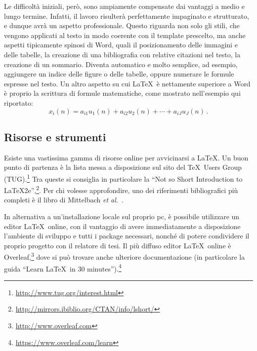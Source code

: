Le difficoltà iniziali, però, sono ampiamente compensate dai vantaggi a medio e lungo termine. Infatti, il lavoro risulterà perfettamente impaginato e strutturato, e dunque avrà un aspetto professionale. Questo riguarda non solo gli stili, che vengono applicati al testo in modo coerente con il template prescelto, ma anche aspetti tipicamente spinosi di Word, quali il posizionamento delle immagini e delle tabelle, la creazione di una bibliografia con relative citazioni nel testo, la creazione di un sommario. Diventa automatico e molto semplice, ad esempio, aggiungere un indice delle figure o delle tabelle, oppure numerare le formule espresse nel testo. Un altro aspetto su cui \LaTeX\ è nettamente superiore a Word è proprio la scrittura di formule matematiche, come mostrato nell'esempio qui riportato:
\begin{equation}
x_i(n) = a_{i1}u_1(n) + a_{i2}u_2(n) + \cdots + a_{iJ}u_J(n) \, .
\label{eq:multimix}
\end{equation}

\subsection{Risorse e strumenti}

Esiste una vastissima gamma di risorse online per avvicinarsi a \LaTeX. Un buon punto di partenza \`e la lista messa a disposizione sul sito del \TeX\ Users Group (TUG).\footnote{\url{http://www.tug.org/interest.html}}
Tra queste si consiglia in particolare la ``Not so Short Introduction to LaTeX2e'',\footnote{\url{http://mirrors.ibiblio.org/CTAN/info/lshort/}}. Per chi volesse approfondire, uno dei riferimenti bibliografici pi\`u completi \`e il libro di Mittelbach {\em et al.}~\cite{mittelbach2004latex}.

In alternativa a un'installazione locale sul proprio pc, \`e possibile utilizzare un editor \LaTeX\ online, con il vantaggio di avere immediatamente a disposizione l'ambiente di sviluppo e tutti i package necessari, nonch\'e di potere condividere il proprio progetto con il relatore di tesi. Il pi\`u diffuso editor \LaTeX\ online \`e Overleaf,\footnote{\url{http://www.overleaf.com}} dove si pu\`o trovare anche ulteriore documentazione (in particolare la guida ``Learn \LaTeX\ in 30 minutes'').\footnote{\url{https://www.overleaf.com/learn}}


